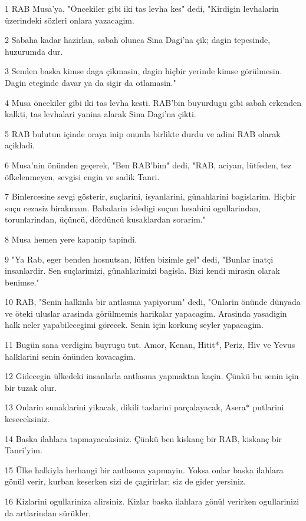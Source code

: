 \par 1 RAB Musa'ya, "Öncekiler gibi iki tas levha kes" dedi, "Kirdigin levhalarin üzerindeki sözleri onlara yazacagim.
\par 2 Sabaha kadar hazirlan, sabah olunca Sina Dagi'na çik; dagin tepesinde, huzurumda dur.
\par 3 Senden baska kimse daga çikmasin, dagin hiçbir yerinde kimse görülmesin. Dagin eteginde davar ya da sigir da otlamasin."
\par 4 Musa öncekiler gibi iki tas levha kesti. RAB'bin buyurdugu gibi sabah erkenden kalkti, tas levhalari yanina alarak Sina Dagi'na çikti.
\par 5 RAB bulutun içinde oraya inip onunla birlikte durdu ve adini RAB olarak açikladi.
\par 6 Musa'nin önünden geçerek, "Ben RAB'bim" dedi, "RAB, aciyan, lütfeden, tez öfkelenmeyen, sevgisi engin ve sadik Tanri.
\par 7 Binlercesine sevgi gösterir, suçlarini, isyanlarini, günahlarini bagislarim. Hiçbir suçu cezasiz birakmam. Babalarin isledigi suçun hesabini ogullarindan, torunlarindan, üçüncü, dördüncü kusaklardan sorarim."
\par 8 Musa hemen yere kapanip tapindi.
\par 9 "Ya Rab, eger benden hosnutsan, lütfen bizimle gel" dedi, "Bunlar inatçi insanlardir. Sen suçlarimizi, günahlarimizi bagisla. Bizi kendi mirasin olarak benimse."
\par 10 RAB, "Senin halkinla bir antlasma yapiyorum" dedi, "Onlarin önünde dünyada ve öteki uluslar arasinda görülmemis harikalar yapacagim. Arasinda yasadigin halk neler yapabilecegimi görecek. Senin için korkunç seyler yapacagim.
\par 11 Bugün sana verdigim buyrugu tut. Amor, Kenan, Hitit*, Periz, Hiv ve Yevus halklarini senin önünden kovacagim.
\par 12 Gidecegin ülkedeki insanlarla antlasma yapmaktan kaçin. Çünkü bu senin için bir tuzak olur.
\par 13 Onlarin sunaklarini yikacak, dikili taslarini parçalayacak, Asera* putlarini keseceksiniz.
\par 14 Baska ilahlara tapmayacaksiniz. Çünkü ben kiskanç bir RAB, kiskanç bir Tanri'yim.
\par 15 Ülke halkiyla herhangi bir antlasma yapmayin. Yoksa onlar baska ilahlara gönül verir, kurban keserken sizi de çagirirlar; siz de gider yersiniz.
\par 16 Kizlarini ogullariniza alirsiniz. Kizlar baska ilahlara gönül verirken ogullarinizi da artlarindan sürükler.
